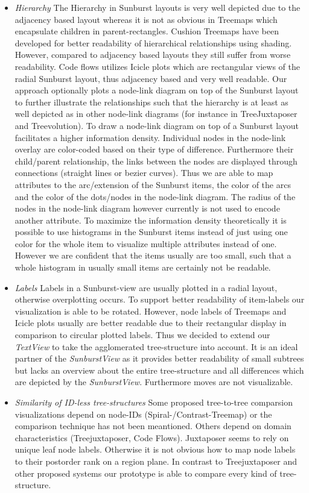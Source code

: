 \begin{itemize}
\item \emph{Hierarchy} The Hierarchy in Sunburst layouts is very well depicted due to the adjacency based layout whereas it is not as obvious in Treemaps which encapsulate children in parent-rectangles. Cushion Treemaps have been developed for better readability of hierarchical relationships using shading. However, compared to adjacency based layouts they still suffer from worse readability. Code flows utilizes Icicle plots which are rectangular views of the radial Sunburst layout, thus adjacency based and very well readable. Our approach optionally plots a node-link diagram on top of the Sunburst layout to further illustrate the relationships such that the hierarchy is at least as well depicted as in other node-link diagrams (for instance in TreeJuxtaposer and Treevolution). To draw a node-link diagram on top of a Sunburst layout facilitates a higher information density. Individual nodes in the node-link overlay are color-coded based on their type of difference. Furthermore their child/parent relationship, the links between the nodes are displayed through connections (straight lines or bezier curves). Thus we are able to map attributes to the arc/extension of the Sunburst items, the color of the arcs and the color of the dots/nodes in the node-link diagram. The radius of the nodes in the node-link diagram however currently is not used to encode another attribute. To maximize the information density theoretically it is possible to use histograms in the Sunburst items instead of just using one color for the whole item to visualize multiple attributes instead of one. However we are confident that the items usually are too small, such that a whole histogram in usually small items are certainly not be readable. 
\item \emph{Labels} Labels in a Sunburst-view are usually plotted in a radial layout, otherwise overplotting occurs. To support better readability of item-labels our visualization is able to be rotated. However, node labels of Treemaps and Icicle plots usually are better readable due to their rectangular display in comparison to circular plotted labels. Thus we decided to extend our \emph{TextView} to take the agglomerated tree-structure into account. It is an ideal partner of the \emph{SunburstView} as it provides better readability of small subtrees but lacks an overview about the entire tree-structure and all differences which are depicted by the \emph{SunburstView}. Furthermore moves are not visualizable.
\item \emph{Similarity of ID-less tree-structures} Some proposed tree-to-tree comparsion visualizations depend on node-IDs (Spiral-/Contrast-Treemap\cite{tu2007visualizing}) or the comparison technique has not been meantioned. Others depend on domain characteristics (Treejuxtaposer\cite{munzner2003treejuxtaposer}, Code Flows\cite{telea2008code}). Juxtaposer seems to rely on unique leaf node labels. Otherwise it is not obvious how to map node labels to their postorder rank on a region plane. In contrast to Treejuxtaposer and other proposed systems our prototype is able to compare every kind of tree-structure.

\end{itemize}
